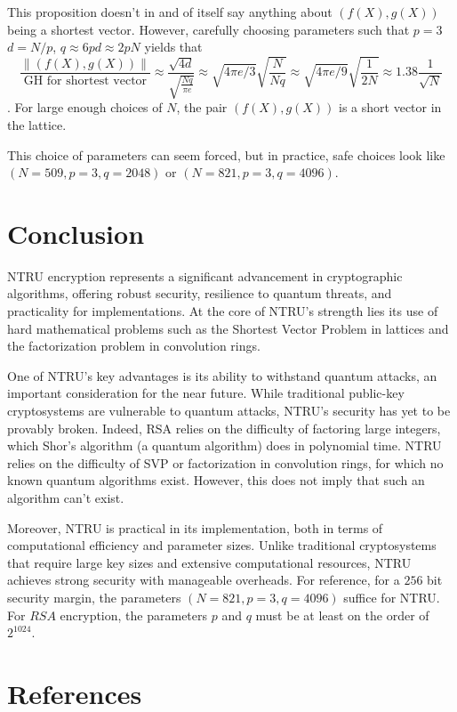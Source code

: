 \documentclass[12pt]{article}
\theoremstyle{definition}
\theoremstyle{proposition}
\theoremstyle{remark}
\theoremstyle{theorem}
\theoremstyle{example}
\begin{document}
This proposition doesn't in and of itself say anything about $(f(X),g(X))$ being a shortest vector. However, carefully choosing parameters such that $p=3$ $d=N/p$, $q \approx 6pd \approx 2pN$ yields that $$\frac{\left\| (f(X),g(X)) \right\|}{\text{GH for shortest vector}} \approx \frac{\sqrt{4d}}{\sqrt{\frac{Nq}{\pi e}}} \approx \sqrt{4\pi e/3} \sqrt{\frac{N}{Nq}} \approx \sqrt{4\pi e/9} \sqrt{\frac{1}{2N}} \approx 1.38 \frac{1}{\sqrt{N}}$$. For large enough choices of $N$, the pair $(f(X),g(X))$ is a short vector in the lattice. 

This choice of parameters can seem forced, but in practice, safe choices look like $(N=509, p=3,q=2048)$ or $(N=821, p=3,q=4096)$.

\section*{Conclusion}

NTRU encryption represents a significant advancement in cryptographic algorithms, offering robust security, resilience to quantum threats, and practicality for implementations. At the core of NTRU's strength lies its use of hard mathematical problems such as the Shortest Vector Problem in lattices and the factorization problem in convolution rings. 

One of NTRU's key advantages is its ability to withstand quantum attacks, an important consideration for the near future. While traditional public-key cryptosystems are vulnerable to quantum attacks, NTRU's security has yet to be provably broken. Indeed, RSA relies on the difficulty of factoring large integers, which Shor's algorithm (a quantum algorithm) does in polynomial time. NTRU relies on the difficulty of SVP or factorization in convolution rings, for which no known quantum algorithms exist. However, this does not imply that such an algorithm can't exist.

Moreover, NTRU is practical in its implementation, both in terms of computational efficiency and parameter sizes. Unlike traditional cryptosystems that require large key sizes and extensive computational resources, NTRU achieves strong security with manageable overheads. For reference, for a $256$ bit security margin, the parameters $(N=821, p=3,q=4096)$ suffice for NTRU. For $RSA$ encryption, the parameters $p$ and $q$ must be at least on the order of $2^{1024}$.

\section*{References}
\end{document}

